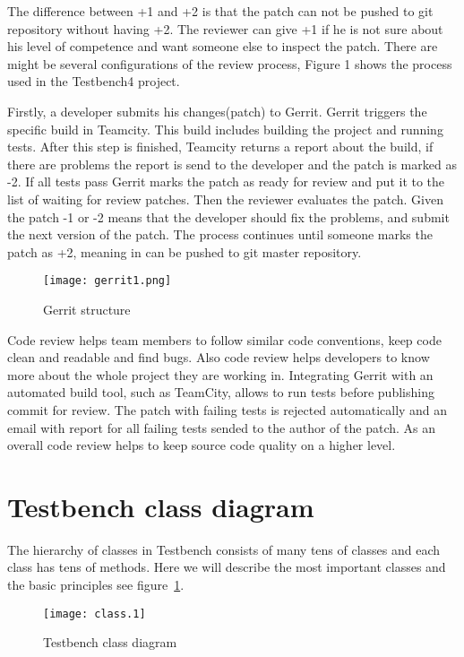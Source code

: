   The difference between +1 and +2 is that the patch can not be pushed to git
  repository without having +2. The reviewer can give +1 if he is not sure about his level of competence
  and want someone else to inspect the patch. There are might be several configurations of the review process,
  Figure 1 shows the process used in the Testbench4 project.

  Firstly, a developer submits his changes(patch) to Gerrit. Gerrit triggers the
  specific build in Teamcity. This build includes building the project and
  running tests. After this step is finished, Teamcity returns a report about the build, if there are problems 
  the report is send to the developer and the patch is marked as -2. If all
  tests pass Gerrit marks the patch as ready for review and put it to the list
  of waiting for review patches.
  Then the reviewer evaluates the patch. Given the patch -1 or -2 means that the developer should fix the problems,
  and submit the next version of the patch. The process continues until someone
  marks the patch as +2,  meaning in can be pushed to git master repository.
    \begin{figure}
      \texttt{[image: gerrit1.png]}
      \caption{Gerrit structure}
    \end{figure}
  Code review helps team members to follow similar code conventions, 
  keep code clean and readable and find bugs. Also code review helps developers to know more about 
  the whole project they are working in. Integrating Gerrit with an automated build tool, 
  such as TeamCity, allows to run tests before publishing commit for review. 
  The patch with failing tests is rejected automatically and an email with report for all failing tests sended 
  to the author of the patch. As an overall code review helps to keep source code quality on a higher level.


  \section{Testbench class diagram}

  The hierarchy of classes in Testbench consists of many tens of classes and each class has tens of methods.
  Here we will describe the most important classes and the basic principles see
  figure~\ref{fig:classdiagram}.
	\begin{figure}
		\label{fig:classdiagram}
	    \texttt{[image: class.1]}
	    \caption{Testbench class diagram}
    \end{figure}
    
